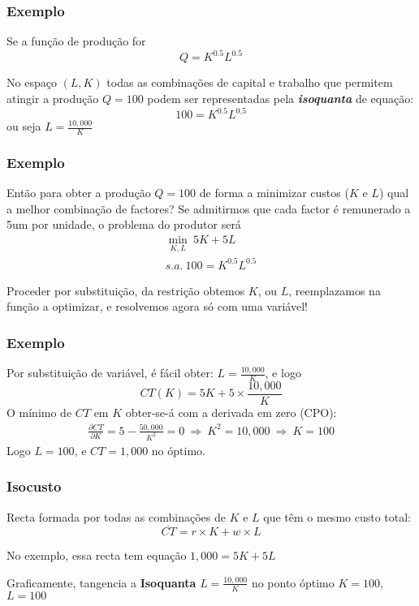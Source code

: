 \begin{frame}
	\frametitle{Exemplo}
	Se a fun\c c\~ao de produ\c c\~ao for \[Q=K^{0.5}L^{0.5}\]

	No espa\c co $(L,K)$ todas as combina\c c\~oes de capital e trabalho que permitem atingir a produ\c c\~ao $Q=100$ podem ser representadas pela \emph{\textbf{isoquanta}} de equa\c c\~ao:\[100=K^{0.5}L^{0.5}\] ou seja $L=\frac{10,000}{K}$
\end{frame}

\begin{frame}
	\frametitle{Exemplo}
	Ent\~ao para obter a produ\c c\~ao $Q=100$ de forma a minimizar custos ($K$ e $L$) qual a melhor combina\c c\~ao de factores? Se admitirmos que cada factor \'e remunerado a 5um por unidade, o problema do produtor ser\'a 
	\begin{align*}
		\min_{K,L} \ 5K+5L\\
		s.a. \ 100=K^{0.5}L^{0.5}
	\end{align*}

	Proceder por substitui\c c\~ao, da restri\c c\~ao obtemos $K$, ou $L$, reemplazamos na fun\c c\~ao a optimizar, e resolvemos agora s\'o com uma vari\'avel!

\end{frame}

\begin{frame}
	\frametitle{Exemplo}
	Por substitui\c c\~ao de vari\'avel, \'e f\'acil obter: \(L=\frac{10,000}{K}\), e logo \[CT(K)=5K+5\times\frac{10,000}{K}\]
	O m\'inimo de $CT$ em $K$ obter-se-\'a com a derivada em zero (CPO):
	\begin{align*}
		\frac{\partial CT}{\partial K}=5-\frac{50,000}{K^2}=0 \ \Rightarrow \ K^2 = 10,000 \ \Rightarrow \ K = 100
	\end{align*}
	Logo $L=100$, e $CT=1,000$ no \'optimo.
\end{frame}

\begin{frame}
	\frametitle{Isocusto}

	\begin{tcolorbox}[title=\textbf{Isocusto},colback=iscal_color!20!white,colframe=iscal_color]
		Recta formada por todas as combina\c c\~oes de $K$ e $L$ que t\^em o mesmo custo total: \[\overline{CT}=r\times K + w\times L\]
	\end{tcolorbox}

	No exemplo, essa recta tem equa\c c\~ao $1,000=5K+5L$

	\vspace{0.5cm}

	Graficamente, tangencia a \textbf{Isoquanta} $L=\frac{10,000}{K}$ no ponto \'optimo $K=100$, $L=100$

\end{frame}

